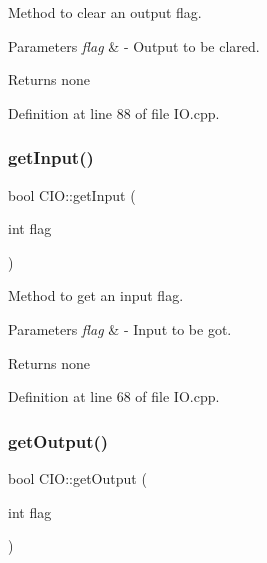 Method to clear an output flag. 


\begin{DoxyParams}{Parameters}
{\em flag} & -\/ Output to be clared. \\
\hline
\end{DoxyParams}
\begin{DoxyReturn}{Returns}
none 
\end{DoxyReturn}


Definition at line 88 of file I\+O.\+cpp.

\mbox{\label{class_c_i_o_aa87a99ef2b17c9243a745a6ec90fc5ef}} 
\subsubsection{\texorpdfstring{get\+Input()}{getInput()}}
{\footnotesize\ttfamily bool C\+I\+O\+::get\+Input (\begin{DoxyParamCaption}\item[{int}]{flag }\end{DoxyParamCaption})}



Method to get an input flag. 


\begin{DoxyParams}{Parameters}
{\em flag} & -\/ Input to be got. \\
\hline
\end{DoxyParams}
\begin{DoxyReturn}{Returns}
none 
\end{DoxyReturn}


Definition at line 68 of file I\+O.\+cpp.

\mbox{\label{class_c_i_o_acc87c3bab69009087ff8cbc09dff88a3}} 
\subsubsection{\texorpdfstring{get\+Output()}{getOutput()}}
{\footnotesize\ttfamily bool C\+I\+O\+::get\+Output (\begin{DoxyParamCaption}\item[{int}]{flag }\end{DoxyParamCaption})}



